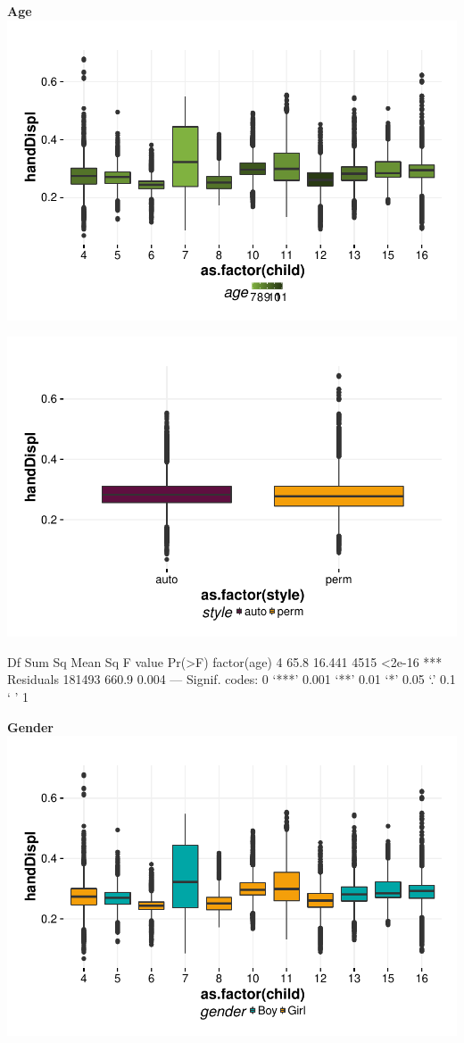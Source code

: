 \documentclass{article}
\begin{document}
\textbf{Age}
\includegraphics{features-plot_handdisplacement_child_age_quiz}

\includegraphics{features-plot_handdisplacement_style_quiz}

\begin{Schunk}
\begin{Soutput}
                Df Sum Sq Mean Sq F value Pr(>F)    
factor(age)      4   65.8  16.441    4515 <2e-16 ***
Residuals   181493  660.9   0.004                   
---
Signif. codes:  0 ‘***’ 0.001 ‘**’ 0.01 ‘*’ 0.05 ‘.’ 0.1 ‘ ’ 1
\end{Soutput}
\end{Schunk}

\textbf{Gender}
\includegraphics{features-plot_handdisplacement_child_gender_quiz}
\end{document}
